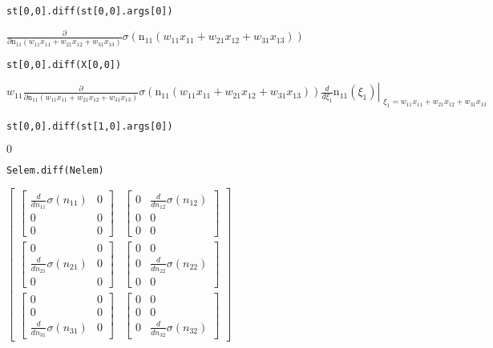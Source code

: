 \documentclass[
]{article}
\begin{document}
\begin{verbatim}
st[0,0].diff(st[0,0].args[0])
\end{verbatim}

\(\displaystyle \frac{\partial}{\partial \operatorname{n_{11}}{\left(w_{11} x_{11} + w_{21} x_{12} + w_{31} x_{13} \right)}} \sigma{\left(\operatorname{n_{11}}{\left(w_{11} x_{11} + w_{21} x_{12} + w_{31} x_{13} \right)} \right)}\)

\begin{verbatim}
st[0,0].diff(X[0,0])
\end{verbatim}

\(\displaystyle w_{11} \frac{\partial}{\partial \operatorname{n_{11}}{\left(w_{11} x_{11} + w_{21} x_{12} + w_{31} x_{13} \right)}} \sigma{\left(\operatorname{n_{11}}{\left(w_{11} x_{11} + w_{21} x_{12} + w_{31} x_{13} \right)} \right)} \left. \frac{d}{d \xi_{1}} \operatorname{n_{11}}{\left(\xi_{1} \right)} \right|_{\substack{ \xi_{1}=w_{11} x_{11} + w_{21} x_{12} + w_{31} x_{13} }}\)

\begin{verbatim}
st[0,0].diff(st[1,0].args[0])
\end{verbatim}

\(\displaystyle 0\)

\begin{verbatim}
Selem.diff(Nelem)
\end{verbatim}

\(\displaystyle \left[\begin{matrix}\left[\begin{matrix}\frac{d}{d n_{11}} \sigma{\left(n_{11} \right)} & 0\\0 & 0\\0 & 0\end{matrix}\right] & \left[\begin{matrix}0 & \frac{d}{d n_{12}} \sigma{\left(n_{12} \right)}\\0 & 0\\0 & 0\end{matrix}\right]\\\left[\begin{matrix}0 & 0\\\frac{d}{d n_{21}} \sigma{\left(n_{21} \right)} & 0\\0 & 0\end{matrix}\right] & \left[\begin{matrix}0 & 0\\0 & \frac{d}{d n_{22}} \sigma{\left(n_{22} \right)}\\0 & 0\end{matrix}\right]\\\left[\begin{matrix}0 & 0\\0 & 0\\\frac{d}{d n_{31}} \sigma{\left(n_{31} \right)} & 0\end{matrix}\right] & \left[\begin{matrix}0 & 0\\0 & 0\\0 & \frac{d}{d n_{32}} \sigma{\left(n_{32} \right)}\end{matrix}\right]\end{matrix}\right]\)
\end{document}
